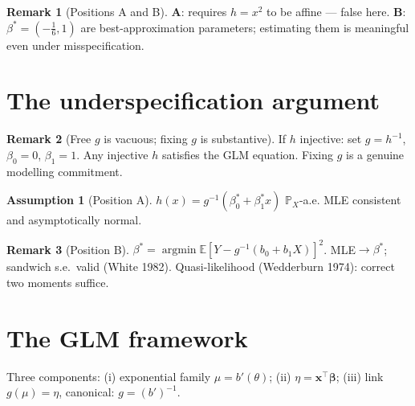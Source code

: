 \documentclass[12pt, a4paper]{article}
\theoremstyle{definition}
\newtheorem{remark}{Remark}[section]
\newtheorem{assumption}{Assumption}[section]
\newcommand{\E}{\mathbb{E}}
\newcommand{\Prob}{\mathbb{P}}
\begin{document}
\begin{remark}[Positions A and B]
\textbf{A}: requires $h=x^2$ to be affine --- false here.
\textbf{B}: $\beta^*=(-\tfrac{1}{6},1)$ are best-approximation
parameters; estimating them is meaningful even under misspecification.
\end{remark}

\section{The underspecification argument}

\begin{remark}[Free $g$ is vacuous; fixing $g$ is substantive]
If $h$ injective: set $g=h^{-1}$, $\beta_0=0$, $\beta_1=1$.
Any injective $h$ satisfies the GLM equation.
Fixing $g$ is a genuine modelling commitment.
\end{remark}

\begin{assumption}[Position A]
$h(x)=g^{-1}(\beta_0^*+\beta_1^*x)$ $\Prob_X$-a.e.
MLE consistent and asymptotically normal.
\end{assumption}

\begin{remark}[Position B]
$\beta^*=\operatorname{argmin}\E[Y-g^{-1}(b_0+b_1X)]^2$.
MLE$\to\beta^*$; sandwich s.e.\ valid (White 1982).
Quasi-likelihood (Wedderburn 1974): correct two moments suffice.
\end{remark}

\section{The GLM framework}

Three components: (i) exponential family $\mu=b'(\theta)$;
(ii) $\eta=\mathbf{x}^\top\boldsymbol\beta$;
(iii) link $g(\mu)=\eta$, canonical: $g=(b')^{-1}$.
\end{document}
